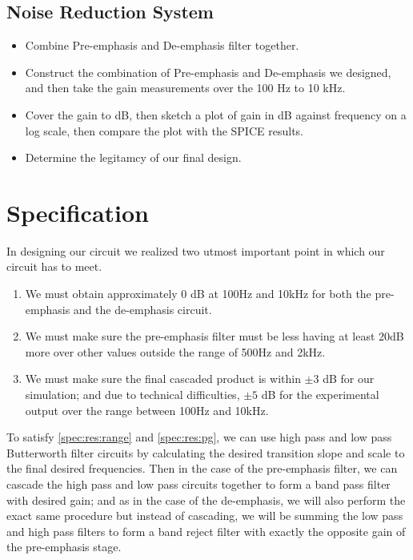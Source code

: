 \documentclass[a4paper]{IEEEtran}
\begin{document}
		\subsection{Noise Reduction System}
			\begin{itemize}
				\item{Combine Pre-emphasis and De-emphasis filter together. }
				\item{Construct the combination of Pre-emphasis and De-emphasis we designed, and then take the gain measurements over the 100 Hz to 10 kHz.}
				\item{Cover the gain to dB, then sketch a plot of gain in dB against frequency on a log scale, then compare the plot with the SPICE results.}
				\item{Determine the legitamcy of our final design.}
			\end{itemize}
	
	\section{Specification}
		In designing our circuit we realized two utmost important point in which our circuit has to meet.
		\begin{enumerate}
			\item \label{spec:res:range} We must obtain approximately 0 dB at 100Hz and 10kHz for both the pre-emphasis and the de-emphasis circuit.
			\item \label{spec:res:pg} We must make sure the pre-emphasis filter must be less having at least 20dB more over other values outside the range of 500Hz and 2kHz.
			\item \label{spec:res:output} We must make sure the final cascaded product is within $\pm 3$ dB for our simulation; and due to technical difficulties, $\pm 5$ dB for the experimental output over the range between 100Hz and 10kHz.
		\end{enumerate}
		
		To satisfy \ref{spec:res:range} and \ref{spec:res:pg}, we can use high pass and low pass Butterworth filter circuits by calculating the desired transition slope and scale to the final desired frequencies. Then in the case of the pre-emphasis filter, we can cascade the high pass and low pass circuits together to form a band pass filter with desired gain; and as in the case of the de-emphasis, we will also perform the exact same procedure but instead of cascading, we will be summing the low pass and high pass filters to form a band reject filter with exactly the opposite gain of the pre-emphasis stage.
		
\end{document}
